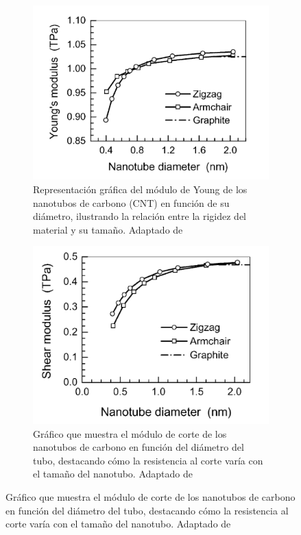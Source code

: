 \documentclass[a4paper]{article}
\begin{document}
\begin{figure}[htbp]
  \centering
  \begin{subfigure}[b]{0.45\textwidth}
    \centering
    \includegraphics[width=\textwidth]{images/young-module.png}
    \caption{Representación gráfica del módulo de Young de los nanotubos de carbono (CNT) en función de su diámetro, ilustrando la relación entre la rigidez del material y su tamaño. Adaptado de \cite{li2003structural}}
    \label{fig:subfig1}
  \end{subfigure}
  \hfill
  \begin{subfigure}[b]{0.45\textwidth}
    \centering
    \includegraphics[width=\textwidth]{images/shear-module.png}
    \caption{Gráfico que muestra el módulo de corte de los nanotubos de carbono en función del diámetro del tubo, destacando cómo la resistencia al corte varía con el tamaño del nanotubo. Adaptado de \cite{li2003structural}}

\end{subfigure}
\end{figure}
\end{document}
